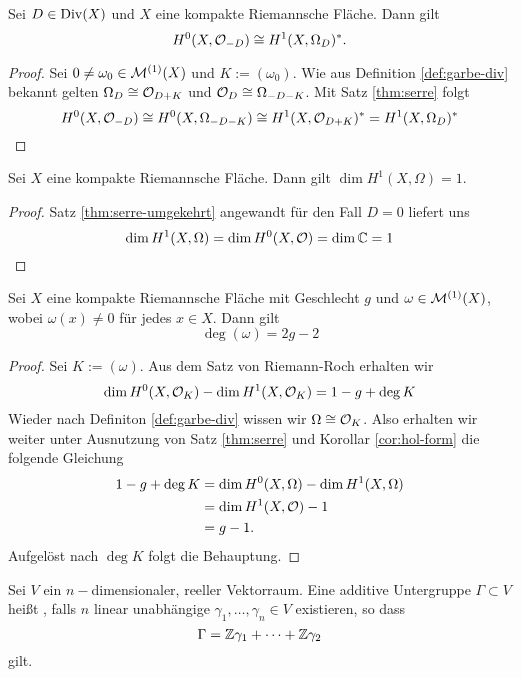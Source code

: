 \begin{thm}
  \label{thm:serre-umgekehrt}
  Sei $D \in \operatorname{Div}(X)$ und $X$ eine kompakte Riemannsche Fläche. Dann
  gilt
  \[
  H^0(X, \mathcal{O}_{-D}) \cong H^1(X, \Omega_D)^\ast.
  \]
\end{thm}

\begin{proof}
  Sei $0 \neq \omega_0 \in \mathcal{M}^{(1)}(X)$ und $K := (\omega_0)$. Wie
  aus Definition \ref{def:garbe-div} bekannt gelten $\Omega_D \cong
  \mathcal{O}_{D+K}$ und $\mathcal{O}_D \cong \Omega_{-D-K}$. Mit Satz
  \ref{thm:serre} folgt
  \[
  H^0(X, \mathcal{O}_{-D}) \cong H^0(X, \Omega_{-D-K}) \cong H^1(X,
  \mathcal{O}_{D+K})^\ast = H^1(X, \Omega_D)^\ast
  \]
\end{proof}

\begin{cor}
  \label{cor:hol-form}
  Sei $X$ eine kompakte Riemannsche Fläche. Dann gilt $\dim H^1(X,
  \Omega) = 1$.
\end{cor}

\begin{proof}
  Satz \ref{thm:serre-umgekehrt} angewandt für den Fall $D = 0$
  liefert uns
  \[
  \dim H^1(X, \Omega) = \dim H^0(X, \mathcal{O}) = \dim \mathbb{C} = 1
  \]
\end{proof}

\begin{thm}
  \label{thm:deg-geschlecht}
  Sei $X$ eine kompakte Riemannsche Fläche mit Geschlecht $g$ und $\omega
  \in \mathcal{M}^{(1)}(X)$, wobei $\omega(x) \neq 0$ für jedes $x \in
  X$. Dann gilt
  \[
  \deg(\omega) = 2g - 2
  \]
\end{thm}

\begin{proof}
  Sei $K := (\omega)$. Aus dem Satz von Riemann-Roch erhalten wir
  \[
  \dim H^0(X, \mathcal{O}_K) - \dim H^1(X, \mathcal{O}_K) = 1 - g + \deg K
  \]
  Wieder nach Definiton \ref{def:garbe-div} wissen wir $\Omega \cong
  \mathcal{O}_K$. Also erhalten wir weiter unter Ausnutzung von Satz
  \ref{thm:serre} und Korollar \ref{cor:hol-form} die folgende Gleichung
  \begin{align*}
    1 - g+ \deg K & = \dim H^0(X, \Omega) - \dim H^1(X, \Omega) \\
    & = \dim H^1(X, \mathcal{O}) - 1 \\
    & = g - 1.
  \end{align*}
  Aufgelöst nach $\deg K$ folgt die Behauptung.
\end{proof}

\begin{defin}
  \label{defin:gitter}
  Sei $V$ ein $n-$dimensionaler, reeller Vektorraum. Eine additive
  Untergruppe $\Gamma \subset V$ heißt , falls $n$ linear
  unabhängige $\gamma_1, \dots, \gamma_n \in V$ existieren, so dass
  \[
  \Gamma = \mathbb{Z} \gamma_1 + \dots + \mathbb{Z} \gamma_2
  \]
  gilt.
\end{defin}

